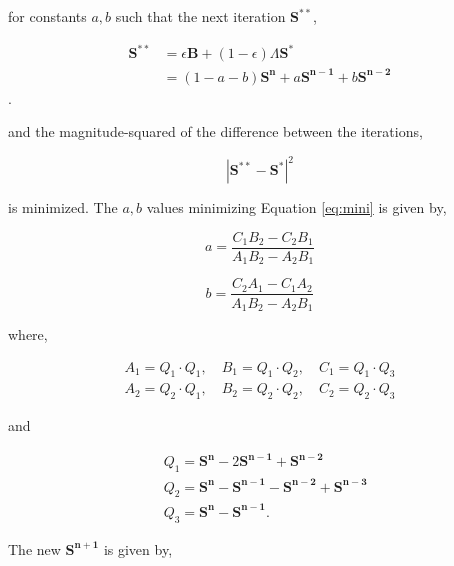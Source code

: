 \documentclass[12pt]{article}
\begin{document}
for constants $a,b$ such that the next iteration $\mathbf{S^{**}}$,

\begin{equation}
\begin{split}
    \mathbf{S^{**}} &= \epsilon \mathbf{B} +(1-\epsilon)\Lambda \mathbf{S^{*}}\\
    & = (1-a-b)\mathbf{S^{n}} + a\mathbf{S^{n-1}} + b\mathbf{S^{n-2}}
\end{split}
\end{equation}. 

and the magnitude-squared of the difference between the iterations,

\begin{equation}\label{eq:mini}
    | \mathbf{S^{**}} - \mathbf{S^{*}}|^{2} 
\end{equation}

is minimized. The $a,b$ values minimizing Equation \ref{eq:mini} is given by,

\begin{equation}
    a = \frac{C_{1}B_{2}-C_{2}B_{1}}{A_{1}B_{2}-A_{2}B_{1}}
\end{equation}

\begin{equation}
    b = \frac{C_{2}A_{1} - C_{1}A_{2}}{A_{1}B_{2}-A_{2}B_{1}}
\end{equation}

where,

\begin{equation}
\begin{split}
    A_{1} = Q_{1}\cdot Q_{1},\quad B_{1}=Q_{1}\cdot Q_{2},\quad C_{1}=Q_{1}\cdot Q_{3}\\
    A_{2} = Q_{2}\cdot Q_{1},\quad B_{2}=Q_{2}\cdot Q_{2},\quad C_{2}=Q_{2}\cdot Q_{3}
\end{split}
\end{equation}

and 

\begin{equation}
    \begin{split}
        & Q_{1} = \mathbf{S^{n}}-2\mathbf{S^{n-1}}+\mathbf{S^{n-2}}\\
        & Q_{2} = \mathbf{S^{n}}-\mathbf{S^{n-1}}-\mathbf{S^{n-2}}+\mathbf{S^{n-3}}\\
        & Q_{3} = \mathbf{S^{n}}-\mathbf{S^{n-1}}.
    \end{split}
\end{equation}

The new $\mathbf{S^{n+1}}$ is given by,
\end{document}

